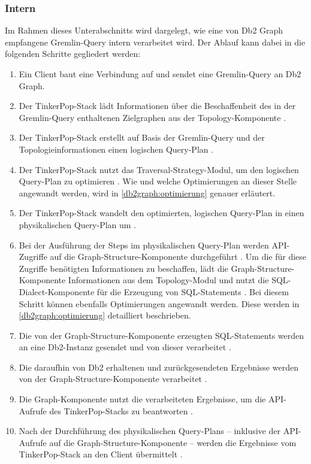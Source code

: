 \subsubsection{Intern}
Im Rahmen dieses Unterabschnitts wird dargelegt, wie eine von Db2 Graph empfangene Gremlin-Query intern verarbeitet wird. Der Ablauf kann dabei in die folgenden Schritte gegliedert werden: 

\begin{enumerate}
    \item Ein Client baut eine Verbindung auf und sendet eine Gremlin-Query an Db2 Graph.
    \item Der TinkerPop-Stack lädt Informationen über die Beschaffenheit des in der Gremlin-Query enthaltenen Zielgraphen aus der Topology-Komponente \cite{vldb_tian,sigmod_tian, yt_tian}.
    \item Der TinkerPop-Stack erstellt auf Basis der Gremlin-Query und der Topologieinformationen einen logischen Query-Plan \cite{vldb_tian,sigmod_tian, yt_tian}. 
    \item Der TinkerPop-Stack nutzt das Traversal-Strategy-Modul, um den logischen Query-Plan zu optimieren \cite{vldb_tian,sigmod_tian, yt_tian}. Wie und welche Optimierungen an dieser Stelle angewandt werden, wird in \autoref{db2graph:optimierung} genauer erläutert.
    \item Der TinkerPop-Stack wandelt den optimierten, logischen Query-Plan in einen physikalischen Query-Plan um \cite{vldb_tian,sigmod_tian, yt_tian}. 
    \item Bei der Ausführung der Steps im physikalischen Query-Plan werden API-Zugriffe auf die Graph-Structure-Komponente durchgeführt \cite{vldb_tian,sigmod_tian, yt_tian}. Um die für diese Zugriffe benötigten Informationen zu beschaffen, lädt die Graph-Structure-Komponente Informationen aus dem Topology-Modul und nutzt die SQL-Dialect-Komponente für die Erzeugung von SQL-Statements \cite{vldb_tian,sigmod_tian, yt_tian}. Bei diesem Schritt können ebenfalls Optimierungen angewandt werden. Diese werden in \autoref{db2graph:optimierung} detailliert beschrieben.
    \item Die von der Graph-Structure-Komponente erzeugten SQL-Statements werden an eine Db2-Instanz gesendet und von dieser verarbeitet \cite{vldb_tian,sigmod_tian, yt_tian}.
    \item Die daraufhin von Db2 erhaltenen und zurückgesendeten Ergebnisse werden von der Graph-Structure-Komponente verarbeitet \cite{yt_tian}. 
    \item Die Graph-Komponente nutzt die verarbeiteten Ergebnisse, um die API-Aufrufe des TinkerPop-Stacks zu beantworten \cite{vldb_tian,sigmod_tian, yt_tian}.
    \item Nach der Durchführung des physikalischen Query-Plans -- inklusive der API-Aufrufe auf die Graph-Structure-Komponente -- werden die Ergebnisse vom TinkerPop-Stack an den Client übermittelt \cite{vldb_tian,sigmod_tian,yt_tian}.
\end{enumerate}

